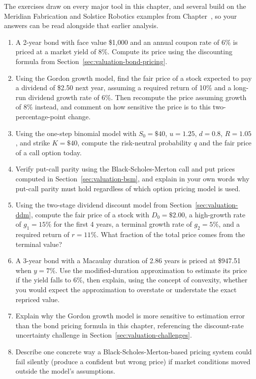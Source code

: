 \documentclass[../ai_in_finance]{subfiles}
\begin{document}

The exercises draw on every major tool in this chapter, and several build on the Meridian Fabrication and Solstice Robotics examples from Chapter~, so your answers can be read alongside that earlier analysis.

\begin{enumerate}[exercises]
    \item A 2-year bond with face value \$1,000 and an annual coupon rate of 6\% is priced at a market yield of 8\%. Compute its price using the discounting formula from Section~\ref{sec:valuation-bond-pricing}.
    \item Using the Gordon growth model, find the fair price of a stock expected to pay a dividend of \$2.50 next year, assuming a required return of 10\% and a long-run dividend growth rate of 6\%. Then recompute the price assuming growth of 8\% instead, and comment on how sensitive the price is to this two-percentage-point change.
    \item Using the one-step binomial model with $S_0 = \$40$, $u = 1.25$, $d = 0.8$, $R = 1.05$, and strike $K = \$40$, compute the risk-neutral probability $q$ and the fair price of a call option today.
    \item Verify put-call parity using the Black-Scholes-Merton call and put prices computed in Section~\ref{sec:valuation-bsm}, and explain in your own words why put-call parity must hold regardless of which option pricing model is used.
    \item Using the two-stage dividend discount model from Section~\ref{sec:valuation-ddm}, compute the fair price of a stock with $D_0=\$2.00$, a high-growth rate of $g_1=15\%$ for the first 4 years, a terminal growth rate of $g_2=5\%$, and a required return of $r=11\%$. What fraction of the total price comes from the terminal value?
    \item A 3-year bond with a Macaulay duration of 2.86 years is priced at \$947.51 when $y=7\%$. Use the modified-duration approximation to estimate its price if the yield falls to 6\%, then explain, using the concept of convexity, whether you would expect the approximation to overstate or understate the exact repriced value.
    \item Explain why the Gordon growth model is more sensitive to estimation error than the bond pricing formula in this chapter, referencing the discount-rate uncertainty challenge in Section~\ref{sec:valuation-challenges}.
    \item Describe one concrete way a Black-Scholes-Merton-based pricing system could fail silently (produce a confident but wrong price) if market conditions moved outside the model's assumptions.

\end{enumerate}
\end{document}
